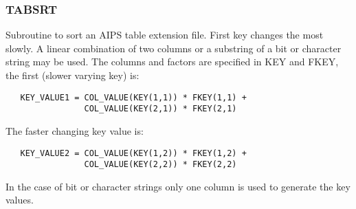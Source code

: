 \subsubsection{TABSRT}
Subroutine to sort an AIPS table extension file.  First key changes
the most slowly.  A linear combination of two columns or a substring
of a bit or character string may be used.  The columns and factors
are specified in KEY and FKEY, the first (slower varying key) is:
\begin{verbatim}
   KEY_VALUE1 = COL_VALUE(KEY(1,1)) * FKEY(1,1) +
                COL_VALUE(KEY(2,1)) * FKEY(2,1)
\end{verbatim}
The faster changing key value is:
\begin{verbatim}
   KEY_VALUE2 = COL_VALUE(KEY(1,2)) * FKEY(1,2) +
                COL_VALUE(KEY(2,2)) * FKEY(2,2)
\end{verbatim}
In the case of bit or character strings only one column is used to
generate the key values.\\
